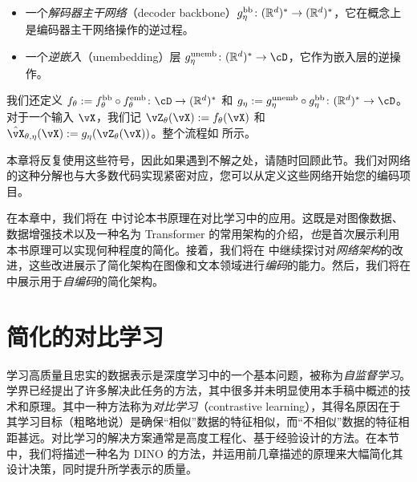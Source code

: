 \documentclass[../../book-main.tex]{subfiles}
\begin{document}
\begin{itemize}
\begin{itemize}
        \item 一个\textit{解码器主干网络}（decoder backbone）\(g_{\eta}^{\mathrm{bb}} \colon (\mathbb{R}^{d})^{*} \to (\mathbb{R}^{d})^{*}\)，它在概念上是编码器主干网络操作的逆过程。
        \item 一个\textit{逆嵌入}（unembedding）层 \(g_{\eta}^{\unemb} \colon (\R^{d})^{*} \to \cD\)，它作为嵌入层的逆操作。
    \end{itemize}
    我们还定义 \(f_{\theta} := f_{\theta}^{\backbone} \circ f_{\theta}^{\emb} \colon \cD \to (\R^{d})^{*}\) 和 \(g_{\eta} := g_{\eta}^{\unemb} \circ g_{\eta}^{\backbone} \colon (\R^{d})^{*} \to \cD\)。对于一个输入 \(\vX\)，我们记 \(\vZ_{\theta}(\vX) := f_{\theta}(\vX)\) 和 \(\hat{\vX}_{\theta, \eta}(\vX) := g_{\eta}(\vZ_{\theta}(\vX))\)。整个流程如  所示。
\end{itemize}

本章将反复使用这些符号，因此如果遇到不解之处，请随时回顾此节。我们对网络的这种分解也与大多数代码实现紧密对应，您可以从定义这些网络开始您的编码项目。

在本章中，我们将在  中讨论本书原理在对比学习中的应用。这既是对图像数据、数据增强技术以及一种名为 Transformer 的常用架构的介绍，\textit{也}是首次展示利用本书原理可以实现何种程度的简化。接着，我们将在  中继续探讨对\textit{网络架构}的改进，这些改进展示了简化架构在图像和文本领域进行\textit{编码}的能力。然后，我们将在  中展示用于\textit{自编码}的简化架构。%


\section{简化的对比学习}\label{sec:contrastive_learning}

学习高质量且忠实的数据表示是深度学习中的一个基本问题，被称为\textit{自监督学习}。学界已经提出了许多解决此任务的方法，其中很多并未明显使用本手稿中概述的技术和原理。其中一种方法称为\textit{对比学习}（contrastive learning），其得名原因在于其学习目标（粗略地说）是确保“相似”数据的特征相似，而“不相似”数据的特征相距甚远。对比学习的解决方案通常是高度工程化、基于经验设计的方法。在本节中，我们将描述一种名为 DINO \citep{caron2021emerging} 的方法，并运用前几章描述的原理来大幅简化其设计决策，同时提升所学表示的质量。
\end{document}
